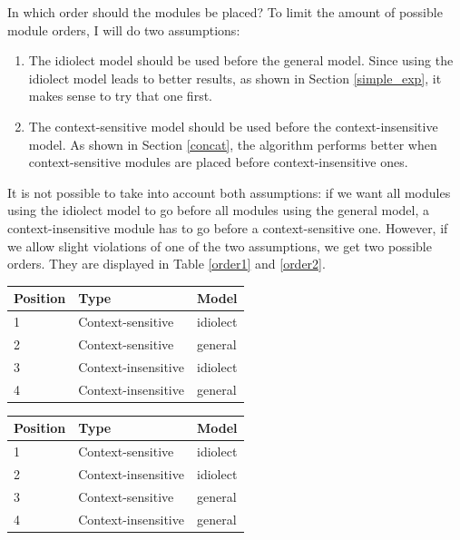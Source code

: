 \documentclass[11pt]{article}
\let\originaltable\table
\let\endoriginaltable\endtable
\renewenvironment{table}[1][ht]{%
  \originaltable[#1]
  \centering}%
  {\endoriginaltable}
\begin{document}
In which order should the modules be placed? To limit the amount of possible module orders, I will do two assumptions:

\begin{enumerate}

\item The idiolect model should be used before the general model. Since using the idiolect model leads to better results, as shown in Section \ref{simple_exp}, it makes sense to try that one first.
\item The context-sensitive model should be used before the context-insensitive model. As shown in Section \ref{concat}, the algorithm performs better when context-sensitive modules are placed before context-insensitive ones.

\end{enumerate}

It is not possible to take into account both assumptions: if we want all modules using the idiolect model to go before all modules using the general model, a context-insensitive module has to go before a context-sensitive one. However, if we allow slight violations of one of the two assumptions, we get two possible orders. They are displayed in Table \ref{order1} and \ref{order2}. 

\begin{table}[H]
\begin{tabular}{lll} 
Position&Type&Model\\
\hline
1&Context-sensitive&idiolect\\
2&Context-sensitive&general\\
3&Context-insensitive&idiolect\\
4&Context-insensitive&general\\
\end{tabular} 
\caption{Module order with the general model as background model, version 1} \label{order1}
\end{table}

\begin{table}[H]
\begin{tabular}{lll} 
Position&Type&Model\\
\hline
1&Context-sensitive&idiolect\\
2&Context-insensitive&idiolect\\
3&Context-sensitive&general\\
4&Context-insensitive&general\\
\end{tabular} 
\caption{Module order with the general model as background model, version 2} \label{order2}
\end{table}
\end{document}
